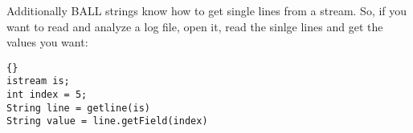 Additionally BALL strings know how to get single lines from a stream. So, if
you want to read and analyze a log file, open it, read the sinlge lines and
get the values you want:
\begin{lstlisting}{}
istream is;
int index = 5;
String line = getline(is)
String value = line.getField(index)
\end{lstlisting}{}
